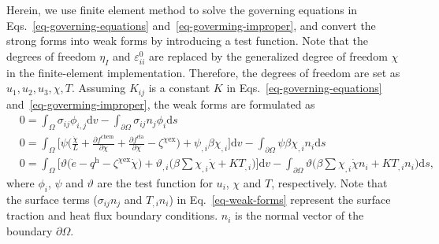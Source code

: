 \documentclass[reprint,3p,sort&compress,times,onecolumn]{elsarticle}
\begin{document}
Herein, we use finite element method to solve the governing equations in Eqs.~\ref{eq-governing-equations} and~\ref{eq-goverming-improper}, and convert the strong forms into weak forms by introducing a test function. Note that the degrees of freedom $\eta_I$ and $\varepsilon_{ii}^0$ are replaced by the generalized degree of freedom $\chi$ in the finite-element implementation.
Therefore, the degrees of freedom are set as $u_1,u_2,u_3,\chi,T$.
Assuming $K_{ij}$ is a constant $K$ in Eqs.~\ref{eq-governing-equations} and~\ref{eq-goverming-improper}, the weak forms are formulated as
\begin{equation}
\begin{split}
&0 = \int_\Omega \sigma_{ij}\phi_{i,j} \text{d}v - \int_{\partial\Omega}\sigma_{ij} n_j \phi_i \text{d}s \\
&0 = \int_\Omega \Big[ \psi \Big(\frac{\dot{\chi}}{L}+ \frac{\partial f^{\text{chem}}}{\partial\chi}+\frac{\partial f^{\text{ela}}}{\partial\chi}- \zeta^{\chi\text{ex}} \Big) + \psi_{,i} \beta \chi_{,i} \Big] \text{d}v - \int_{\partial\Omega} \psi \beta \chi_{,i}n_i  \text{d}s \\
&0 = \int_\Omega \Big[ \vartheta\Big(\dot{e}- q^{\text{h}} -\zeta^{\chi \text{ex}} \dot{\chi} \Big) + \vartheta_{,i}\Big(\beta\sum \chi_{,i}\dot{\chi} +K T_{,i} \Big) \Big] \text{d}v -\int_{\partial\Omega} \vartheta \Big( \beta\sum \chi_{,i}\dot{\chi}n_i + K T_{,i}n_i \Big) \text{d}s ,
\end{split} \label{eq-weak-forms}
\end{equation}
where $\phi_i$, $\psi$ and $\vartheta$ are the test function for $u_i$, $\chi$ and $T$, respectively.
Note that the surface terms ($\sigma_{ij}n_j$ and $T_{,i}n_i$) in Eq.~\ref{eq-weak-forms} represent the surface traction and heat flux boundary conditions. $n_i$ is the normal vector of the boundary $\partial\Omega$.
\end{document}
